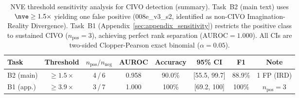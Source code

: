 \begin{table}[h]
\centering
\caption{NVE threshold sensitivity analysis for CIVO detection (summary). Task~B2 (main text) uses $\nve \geq 1.5\times$ yielding one false positive (008e\_v3\_s2, identified as non-CIVO Imagination-Reality Divergence). Task~B1 (Appendix~\ref{sec:appendix_sensitivity}) restricts the positive class to sustained CIVO ($n_{\text{pos}}=3$), achieving perfect rank separation ($\text{AUROC}=1.000$). All CIs are two-sided Clopper-Pearson exact binomial ($\alpha = 0.05$).}
\label{tab:nve_sensitivity}
\small
\setlength{\tabcolsep}{4pt}
\begin{tabular}{@{}lccccccc@{}}
\toprule
Task & Threshold & $n_{\text{pos}}/n_{\text{neg}}$ & AUROC & Accuracy & 95\% CI & F1 & Note \\
\midrule
B2 (main) & $\geq 1.5\times$ & 4\,/\,6 & 0.958 & 90.0\% & [55.5, 99.7] & 88.9\% & 1 FP (IRD) \\
B1 (app.) & $\geq 3.9\times$ & 3\,/\,7 & 1.000 & 100\% & [69.2, 100] & 100\% & $n_{\text{pos}}\!=\!3$ \\
\bottomrule
\end{tabular}
\end{table}
